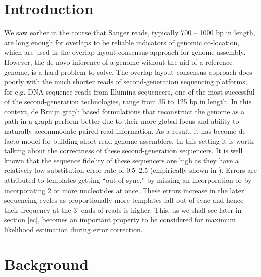 \documentclass[11pt]{article}
\begin{document}
\section{Introduction}
We saw earlier in the course that Sanger reads, typically 700 -- 1000 bp in length, are long enough for overlaps to be reliable indicators of genomic co-location, which are used in the overlap-layout-consensus approach for genome assembly. However, the de novo inference of a genome without the aid of a reference genome, is a hard problem to solve. The overlap-layout-consensus approach does poorly with the much shorter reads of second-generation sequencing platforms; for e.g. DNA sequence reads from Illumina sequencers, one of the most successful of the second-generation technologies, range from 35 to 125 bp in length. In this context, de Bruijn graph \cite{debruijn} based formulations that reconstruct the genome as a path in a graph perform better due to their more global focus and ability to naturally accommodate paired read information. As a result, it has become de facto model for building short-read genome assemblers. In this setting it is worth talking about the correctness of these second-generation sequencers. It is well known that the sequence fidelity of these sequencers are high as they have a relatively low substitution error rate of 0.5--2.5 (empirically shown in \cite{quake}). Errors are attributed to templates getting “out of sync,” by missing an incorporation or by incorporating 2 or more nucleotides at once. These errors increase in the later sequencing cycles as proportionally more templates fall out of sync and hence their frequency at the 3' ends of reads is higher. This, as we shall see later in section \ref{ec}, becomes an important property to be considered for maximum likelihood estimation during error correction.\\

\section{Background}
\end{document}
